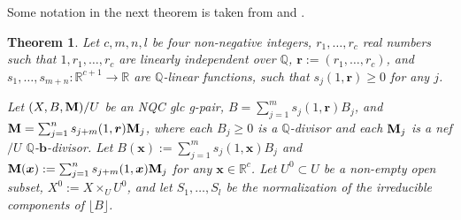 \documentclass[11pt]{amsart}
\numberwithin{equation}{section}
\newcommand{\bb}{\bm{b}}
\newcommand{\Mm}{{\bf{M}}}
\newcommand{\Qq}{\mathbb{Q}}
\newtheorem{thm}{Theorem}[section]
\theoremstyle{definition}
\theoremstyle{definition}
\theoremstyle{definition}
\begin{document}
Some notation in the next theorem is taken from \cite{HLS19} and \cite{Nak16}.
\begin{thm}\label{thm: shokurov polytope gpair}
Let $c,m,n,l$ be four non-negative integers, $r_1,\dots,r_c$ real numbers such that $1,r_1,\dots,r_c$ are linearly independent over $\Qq$, $\bm{r}:=(r_1,\dots,r_c)$, and $s_1,\dots,s_{m+n}:\mathbb R^{c+1}\rightarrow\mathbb R$ are $\Qq$-linear functions, such that $s_j(1,\bm{r})\geq 0$ for any $j$.

Let $(X,B,\Mm)/U$ be an NQC glc g-pair, $B=\sum_{j=1}^ms_j(1,\bm{r})B_j$, and $\Mm=\sum_{j=1}^ns_{j+m}(1,\bm{r})\Mm_j$, where each $B_j\geq 0$ is a $\Qq$-divisor and each $\Mm_j$ is a nef$/U$ $\Qq$-$\bb$-divisor. Let $B(\bm{x}):=\sum_{j=1}^ms_j(1,\bm{x})B_j$ and $\Mm(\bm{x}):=\sum_{j=1}^ns_{j+m}(1,\bm{x})\Mm_j$ for any $\bm{x}\in\mathbb R^c$. Let $U^0\subset U$ be a non-empty open subset, $X^0:=X\times_UU^0$, and let $S_1,\dots,S_l$ be the normalization of the irreducible components of $\lfloor B\rfloor$.


\end{thm}
\end{document}
